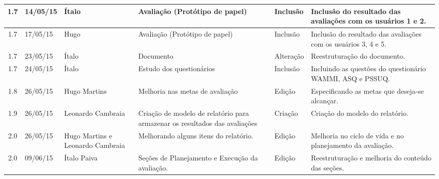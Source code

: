 \begin{longtable}{|c|m{2cm}|m{2.8cm}|m{2.3cm}|m{2.44cm}|m{4.2cm}|}
  \hline                               
  1.7 & 14/05/15 & Ítalo & Avaliação (Protótipo de papel) & Inclusão & Inclusão do resultado das avaliações com os usuários 1 e 2.\\
  
  \hline                               
  1.7 & 17/05/15 & Hugo & Avaliação (Protótipo de papel) & Inclusão & Inclusão do resultado das avaliações com os usuários 3, 4 e 5.\\
  
  \hline                               
  1.7 & 23/05/15 & Ítalo & Documento & Alteração & Reestruturação do documento.\\
  
  \hline                               
  1.7 & 24/05/15 & Ítalo & Estudo dos questionários & Inclusão & Incluindo as questões do questionário WAMMI, ASQ e PSSUQ.\\
  
  \hline                               
  1.8 & 26/05/15 & Hugo Martins & Melhoria nas metas de avaliação & Edição & Especificando as metas que deseja-se alcançar.\\
  
  \hline                               
  1.9 & 26/05/15 & Leonardo Cambraia & Criação de modelo de relatório para armazenar os resultados das avaliações & Criação & Criação do modelo do relatório.\\
  
  \hline                               
  2.0 & 26/05/15 & Hugo Martins e Leonardo Cambraia & Melhorando alguns itens do relatório. & Edição & Melhoria no ciclo de vida e no planejamento da avaliação.\\
  
  \hline                               
  2.0 & 09/06/15 & Ítalo Paiva & Seções de Planejamento e Execução da avaliação. & Edição & Reestruturação e melhoria do conteúdo das seções.\\
  
  \hline
\end{longtable}
